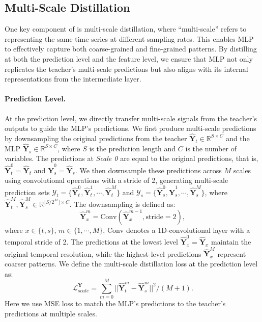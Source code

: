 \subsection{Multi-Scale Distillation}
One key component of \method{} is multi-scale distillation, where ``multi-scale'' refers to representing the same time series at different sampling rates. This enables MLP to effectively capture both coarse-grained and fine-grained patterns. By distilling at both the prediction level and the feature level, we ensure that MLP not only replicates the teacher's multi-scale predictions but also aligns with its internal representations from the intermediate layer.

\vspace{-0.5em}
\paragraph{Prediction Level.}
At the prediction level, we directly transfer multi-scale signals from the teacher’s outputs to guide the MLP’s predictions. We first produce multi-scale predictions by downsampling the original predictions from the teacher \(\mathbf{\hat{Y}}_t \in \mathbb{R}^{S \times C}\) and the MLP \(\mathbf{\hat{Y}}_s \in \mathbb{R}^{S \times C}\), where \(S\) is the prediction length and \(C\) is the number of variables. The predictions at \textit{Scale 0} are equal to the original predictions, that is, \(\mathbf{\hat{Y}}_t^0=\mathbf{\hat{Y}}_t\) and \(\mathbf{\hat{Y}}_s^0=\mathbf{\hat{Y}}_s\). We then downsample these predictions across \(M\) scales using convolutional operations with a stride of 2, generating multi-scale prediction sets \(\mathcal{Y}_t = \{\mathbf{\hat{Y}}_t^0, \mathbf{\hat{Y}}_t^1,\cdots,\mathbf{\hat{Y}}_t^M\}\) and \(\mathcal{Y}_s = \{\mathbf{\hat{Y}}_s^0, \mathbf{\hat{Y}}_s^1,\cdots,\mathbf{\hat{Y}}_s^M\}\), where \(\mathbf{\hat{Y}}_t^M, \mathbf{\hat{Y}}_s^M \in \mathbb{R}^{\lfloor S/2^M \rfloor \times C}\). The downsampling is defined as: 
\begin{equation}
    \mathbf{\hat{Y}}_x^m = \mathrm{Conv}(\mathbf{\hat{Y}}_x^{m-1}, \mathrm{stride}=2),
    \label{eq:multiscale_downsample}
\end{equation}
where \(x \in \{t, s\}\), \(m \in \{1, \cdots, M\}\), $\mathrm{Conv}$ denotes a 1D-convolutional layer with a temporal stride of 2. The predictions at the lowest level \(\mathbf{\hat{Y}}_x^0=\mathbf{\hat{Y}}_x\) maintain the original temporal resolution, while the highest-level predictions \(\mathbf{\hat{Y}}_x^M\) represent coarser patterns. We define the multi-scale distillation loss at the prediction level as:
\begin{equation}
    \mathcal{L}_{scale}^\mathbf{Y} = \textstyle\sum_{m=0}^M ||\mathbf{\hat{Y}}_t^m - \mathbf{\hat{Y}}_s^m||^2 /(M+1).
\end{equation}
Here we use MSE loss to match the MLP’s predictions to the teacher’s predictions at multiple scales.


